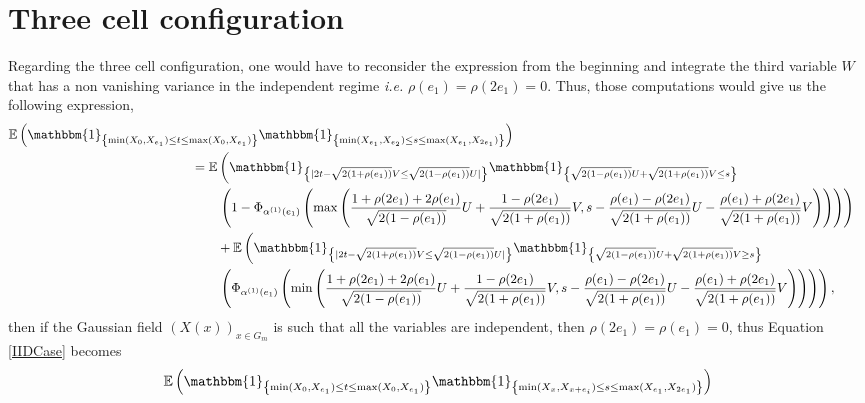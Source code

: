 \documentclass[12pt]{article}
\theoremstyle{Theorem}
\begin{document}
{\section{Three cell configuration}
Regarding the three cell configuration, one would have to reconsider the expression from the beginning and integrate the third variable $W$ that has a non vanishing variance in the independent regime \textit{i.e.} $\rho(e_1) = \rho(2e_1)=0$. Thus, those computations would give us the following expression,
{\tiny
\begin{align}
\label{IIDCase}
\mathbb{E}\left(\mathbbm{1}_{\left\{\min(X_{\scriptscriptstyle 0}, X_{e_1}) \leq t \leq \max(X_{\scriptscriptstyle 0}, X_{e_1})\right\}}\mathbbm{1}_{\left\{\min(X_{e_1}, X_{e_2}) \leq s \leq \max(X_{e_1}, X_{2e_1}) \right\}}\right) \nonumber \\
& \hspace{-8.7cm} = \mathbb{E}\left(\mathbbm{1}_{\left\{|2t - \sqrt{2(1+\rho(e_1))}V \leq \sqrt{2(1-\rho(e_1))}U|\right\}}\mathbbm{1}_{\left\{\sqrt{2(1-\rho(e_1))}U + \sqrt{2(1+\rho(e_1))}V \leq s\right\}}\right. \nonumber \\
& \hspace{-8cm} \left. \left(1 - \Phi_{\alpha^{(1)}(e_1)}\left(\max\left(\frac{1 + \rho(2e_1) + 2\rho(e_1)}{\sqrt{2(1-\rho(e_1))}}U + \frac{1-\rho(2e_1)}{\sqrt{2(1+\rho(e_1))}}V, s - \frac{\rho(e_1) - \rho(2e_1)}{\sqrt{2(1+\rho(e_1))}} U - \frac{\rho(e_1) + \rho(2e_1)}{\sqrt{2(1+\rho(e_1))}}V \right) \right)\right)\right) \nonumber\\
& \hspace{-8cm} + \mathbb{E}\left(\mathbbm{1}_{\left\{|2t - \sqrt{2(1+\rho(e_1))}V \leq \sqrt{2(1-\rho(e_1))}U|\right\}}\mathbbm{1}_{\left\{\sqrt{2(1-\rho(e_1))}U+ \sqrt{2(1+\rho(e_1))}V \geq s\right\}}\right. \nonumber\\
& \hspace{-8cm} \left. \left(\Phi_{\alpha^{(1)}(e_1)}\left(\min\left(\frac{1 + \rho(2e_1) + 2\rho(e_1)}{\sqrt{2(1-\rho(e_1))}}U + \frac{1-\rho(2e_1)}{\sqrt{2(1+\rho(e_1))}}V, s - \frac{\rho(e_1) - \rho(2e_1)}{\sqrt{2(1+\rho(e_1))}} U - \frac{\rho(e_1) + \rho(2e_1)}{\sqrt{2(1+\rho(e_1))}}V \right) \right)\right)\right),
\end{align}}then if the Gaussian field $\left(X(x)\right)_{x \in G_{m}}$ is such that all the variables are independent, then $\rho(2e_1) = \rho(e_1) = 0$, thus Equation \eqref{IIDCase} becomes 
{\small
\begin{align*}
\mathbb{E}\left(\mathbbm{1}_{\left\{\min(X_{\scriptscriptstyle 0}, X_{e_1}) \leq t \leq \max(X_{\scriptscriptstyle 0}, X_{e_1})\right\}}\mathbbm{1}_{\left\{\min(X_{\scriptscriptstyle x}, X_{x+e_i}) \leq s \leq \max(X_{e_1}, X_{2e_1}) \right\}}\right) & \\

\end{align*}}}
\end{document}
